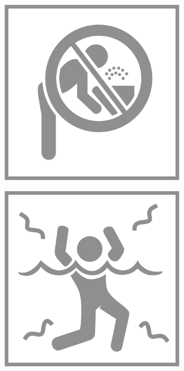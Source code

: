 \begin{figure}[H]
\begin{subfigure}[l]{0.195\linewidth}
  \end{subfigure}
  \begin{subfigure}[l]{0.195\linewidth}
    \includegraphics[width=\textwidth]{Sources/PortalIcons/d8.jpg}
  \end{subfigure}
  \begin{subfigure}[l]{0.195\linewidth}
    \includegraphics[width=\textwidth]{Sources/PortalIcons/d9.jpg}

\end{subfigure}
\end{figure}
